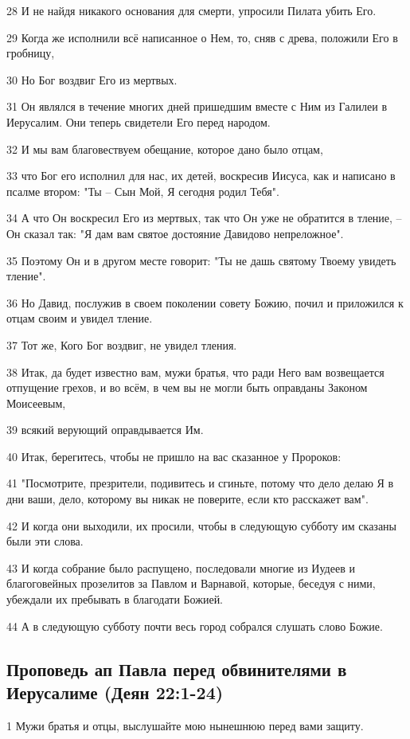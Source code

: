 28 И не найдя никакого основания для смерти, упросили Пилата убить Его.

29 Когда же исполнили всё написанное о Нем, то, сняв с древа, положили Его в гробницу,

30 Но Бог воздвиг Его из мертвых.

31 Он являлся в течение многих дней пришедшим вместе с Ним из Галилеи в Иерусалим. Они теперь свидетели Его перед народом.

32 И мы вам благовествуем обещание, которое дано было отцам,

33 что Бог его исполнил для нас, их детей, воскресив Иисуса, как и написано в псалме втором: "Ты – Сын Мой, Я сегодня родил Тебя".

34 А что Он воскресил Его из мертвых, так что Он уже не обратится в тление, – Он сказал так: "Я дам вам святое достояние Давидово непреложное".

35 Поэтому Он и в другом месте говорит: "Ты не дашь святому Твоему увидеть тление".

36 Но Давид, послужив в своем поколении совету Божию, почил и приложился к отцам своим и увидел тление.

37 Тот же, Кого Бог воздвиг, не увидел тления.

38 Итак, да будет известно вам, мужи братья, что ради Него вам возвещается отпущение грехов, и во всём, в чем вы не могли быть оправданы Законом Моисеевым,

39 всякий верующий оправдывается Им.

40 Итак, берегитесь, чтобы не пришло на вас сказанное у Пророков:

41 "Посмотрите, презрители, подивитесь и сгиньте, потому что дело делаю Я в дни ваши, дело, которому вы никак не поверите, если кто расскажет вам".

42 И когда они выходили, их просили, чтобы в следующую субботу им сказаны были эти слова.

43 И когда собрание было распущено, последовали многие из Иудеев и благоговейных прозелитов за Павлом и Варнавой, которые, беседуя с ними, убеждали их пребывать в благодати Божией.

44 А в следующую субботу почти весь город собрался слушать слово Божие.

\subsection*{Проповедь ап Павла перед обвинителями в Иерусалиме (Деян 22:1-24)}
1 Мужи братья и отцы, выслушайте мою нынешнюю перед вами защиту.

